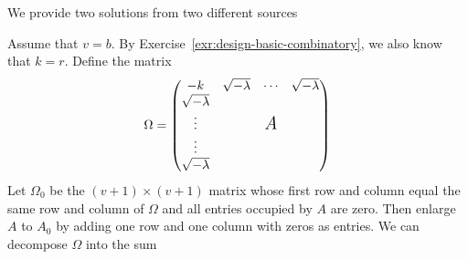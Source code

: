 \begin{solution} We provide two solutions from two different sources

    \citep{Chowla_Ryser_1950} Assume that $v=b$. By Exercise~\ref{exr:design-basic-combinatory}, we also know that $k=r$. Define the matrix
    $$
        \Omega = \begin{pmatrix}
            -k  &\sqrt{-\lambda}    &\cdots &\sqrt{-\lambda}\\
            \sqrt{-\lambda}\\
            \vdots  &   &\textit{\Large A}\\
            \vdots\\
            \sqrt{-\lambda}
        \end{pmatrix}
    $$
    Let $\Omega_0$ be the $(v+1)\times(v+1)$ matrix whose first row and column equal the same row and column of $\Omega$ and all entries occupied by $A$ are zero. Then enlarge $A$ to $A_0$ by adding one row and one column with zeros as entries. We can decompose $\Omega$ into the sum
    

\end{solution}
